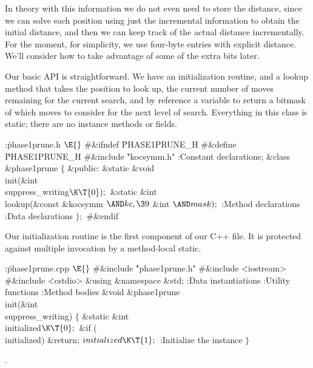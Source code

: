 In theory with this information we do not even need to store the
distance, since we can solve each position using just the incremental
information to obtain the initial distance, and then we can keep track
of the actual distance incrementally.  For the moment, for simplicity,
we use four-byte entries with explicit distance.  We'll consider how
to take advantage of some of the extra bits later.

Our basic API is straightforward.  We have an initialization routine,
and a lookup method that takes the position to look up, the current
number of moves remaining for the current search, and by reference a
variable to return a bitmask of which moves to consider for the next
level of search.  Everything in this class is static; there are no
instance methods or fields.

\Y\B\4:\.{phase1prune.h }\X${}\E{}$\6
\8\#\&{ifndef} \.{PHASE1PRUNE\_H}\6
\8\#\&{define} \.{PHASE1PRUNE\_H}\6
\8\#\&{include} \.{"kocsymm.h"}\6
:Constant declarations\X;\7
\&{class} \&{phase1prune} ${}\{{}$\1\6
\4\&{public}:\6
\&{static} \&{void} \\{init}(\&{int} \\{suppress\_writing}${}\K\T{0});{}$\6
\&{static} \&{int} \\{lookup}(\&{const} \&{kocsymm} ${}{\AND}\\{kc},\39{}$%
\&{int} ${}{\AND}\\{mask});{}$\7
:Method declarations\X\6
:Data declarations\X\2\6
${}\};{}$\6
\8\#\&{endif}\par
\fi

Our initialization routine is the first component of our C++ file.
It is protected against multiple invocation by a method-local static.

\Y\B\4:\.{phase1prune.cpp }\X${}\E{}$\6
\8\#\&{include} \.{"phase1prune.h"}\6
\8\#\&{include} \.{<iostream>}\6
\8\#\&{include} \.{<cstdio>}\6
\&{using} \&{namespace} \&{std};\7
:Data instantiations\X\6
:Utility functions\X\6
:Method bodies\X\7
\&{void} \&{phase1prune}\DC\\{init}(\&{int} \\{suppress\_writing})\1\1\2\2\6
${}\{{}$\1\6
\&{static} \&{int} \\{initialized}${}\K\T{0};{}$\7
\&{if} (\\{initialized})\1\5
\&{return};\2\6
${}\\{initialized}\K\T{1};{}$\6
:Initialize the instance\X\6
\4${}\}{}$\2\par
{}.\fi

